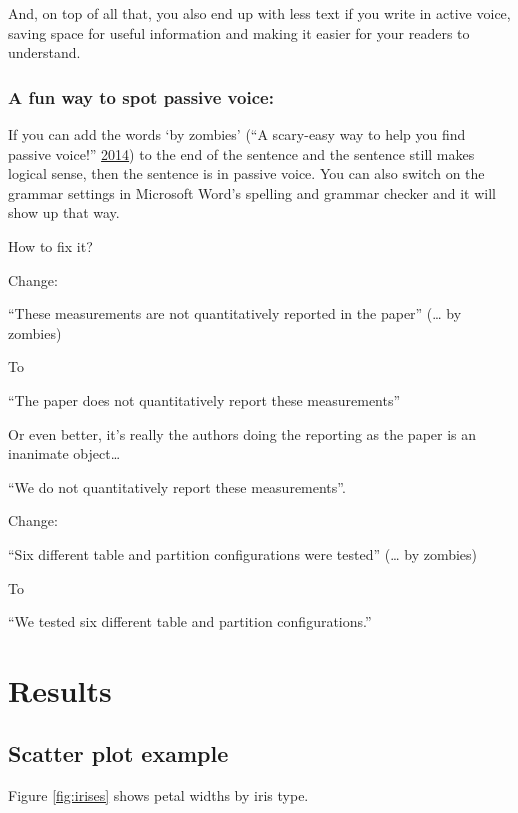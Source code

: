 \documentclass[]{elsarticle} %
\begin{document}
And, on top of all that, you also end up with less text if you write in
active voice, saving space for useful information and making it easier
for your readers to understand.

\subsubsection{A fun way to spot passive
voice:}\label{a-fun-way-to-spot-passive-voice}

If you can add the words `by zombies' (``A scary-easy way to help you
find passive voice!''
\protect\hyperlink{ref-ScaryeasyWayHelp2014}{2014}) to the end of the
sentence and the sentence still makes logical sense, then the sentence
is in passive voice. You can also switch on the grammar settings in
Microsoft Word's spelling and grammar checker and it will show up that
way.

How to fix it?

Change:

``These measurements are not quantitatively reported in the paper''
(\ldots{} by zombies)

To

``The paper does not quantitatively report these measurements''

Or even better, it's really the authors doing the reporting as the paper
is an inanimate object\ldots{}

``We do not quantitatively report these measurements''.

Change:

``Six different table and partition configurations were tested''
(\ldots{} by zombies)

To

``We tested six different table and partition configurations.''

\section{Results}\label{results}

\subsection{Scatter plot example}\label{scatter-plot-example}

Figure \ref{fig:irises} shows petal widths by iris type.
\end{document}
